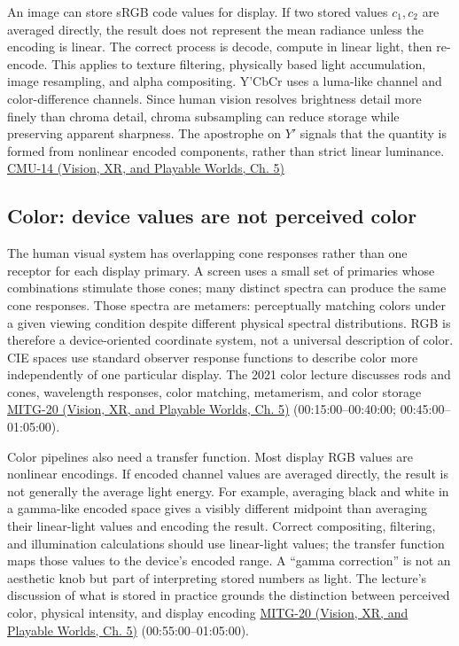 An image can store sRGB code values for display. If two stored values \(c_1,c_2\) are averaged directly, the result does not represent the mean radiance unless the encoding is linear. The correct process is decode, compute in linear light, then re-encode. This applies to texture filtering, physically based light accumulation, image resampling, and alpha compositing. Y'CbCr uses a luma-like channel and color-difference channels. Since human vision resolves brightness detail more finely than chroma detail, chroma subsampling can reduce storage while preserving apparent sharpness. The apostrophe on \(Y'\) signals that the quantity is formed from nonlinear encoded components, rather than strict linear luminance. \href{../07-Vision-XR-and-Playable-Worlds/main.pdf\#nameddest=04-visual-computing-ii-ch036-cmu-14---color}{CMU-14 (Vision, XR, and Playable Worlds, Ch. 5)}

\subsection{Color: device values are not perceived color}\label{03-visual-computing-i-ch004-color-device-values-are-not-perceived-color}

\hypertarget{03-visual-computing-i-ch004-color-device-values-are-not-perceived-color}{}

The human visual system has overlapping cone responses rather than one receptor for each display primary. A screen uses a small set of primaries whose combinations stimulate those cones; many distinct spectra can produce the same cone responses. Those spectra are metamers: perceptually matching colors under a given viewing condition despite different physical spectral distributions. RGB is therefore a device-oriented coordinate system, not a universal description of color. CIE spaces use standard observer response functions to describe color more independently of one particular display. The 2021 color lecture discusses rods and cones, wavelength responses, color matching, metamerism, and color storage \href{../07-Vision-XR-and-Playable-Worlds/main.pdf\#nameddest=04-visual-computing-ii-ch036-mitg-20---color}{MITG-20 (Vision, XR, and Playable Worlds, Ch. 5)} (00:15:00--00:40:00; 00:45:00--01:05:00).

Color pipelines also need a transfer function. Most display RGB values are nonlinear encodings. If encoded channel values are averaged directly, the result is not generally the average light energy. For example, averaging black and white in a gamma-like encoded space gives a visibly different midpoint than averaging their linear-light values and encoding the result. Correct compositing, filtering, and illumination calculations should use linear-light values; the transfer function maps those values to the device's encoded range. A ``gamma correction'' is not an aesthetic knob but part of interpreting stored numbers as light. The lecture's discussion of what is stored in practice grounds the distinction between perceived color, physical intensity, and display encoding \href{../07-Vision-XR-and-Playable-Worlds/main.pdf\#nameddest=04-visual-computing-ii-ch036-mitg-20---color}{MITG-20 (Vision, XR, and Playable Worlds, Ch. 5)} (00:55:00--01:05:00).


